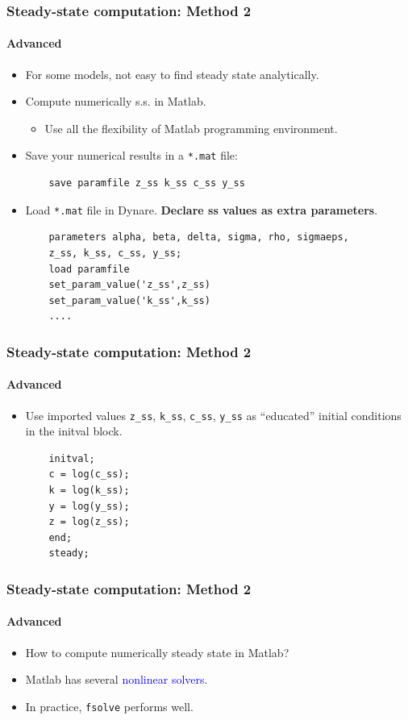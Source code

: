 \documentclass{beamer}
\begin{document}
\begin{frame}[fragile]
\frametitle{Steady-state computation: Method 2}
\framesubtitle{Advanced}
\small 
\begin{itemize}
	\item For some models, not easy to find steady state analytically.
	\item Compute numerically s.s. in Matlab.
	\begin{itemize}
		\item Use all the flexibility of Matlab programming environment.
	\end{itemize}
    \item Save your numerical results in a \texttt{*.mat} file:
	\begin{verbatim}
	save paramfile z_ss k_ss c_ss y_ss
	\end{verbatim}
	\item Load \texttt{*.mat} file in Dynare. \textbf{Declare ss values as extra parameters}.
	\begin{verbatim}
	parameters alpha, beta, delta, sigma, rho, sigmaeps, 
	z_ss, k_ss, c_ss, y_ss;  
	load paramfile
	set_param_value('z_ss',z_ss)
	set_param_value('k_ss',k_ss)
	....
	\end{verbatim}
\end{itemize}
\end{frame}

\begin{frame}[fragile]
\frametitle{Steady-state computation: Method 2}
\framesubtitle{Advanced}
\small 
\begin{itemize}
	\item Use imported values \texttt{z\_ss}, \texttt{k\_ss}, \texttt{c\_ss}, \texttt{y\_ss} as ``educated'' initial conditions in the initval block.
	\begin{verbatim}
	initval;
	c = log(c_ss);
	k = log(k_ss);
	y = log(y_ss);
	z = log(z_ss);
	end;
	steady;
	\end{verbatim}
\end{itemize}
\end{frame}

\begin{frame}[fragile]
\frametitle{Steady-state computation: Method 2}
\framesubtitle{Advanced}
\small 
\begin{itemize}
	\item How to compute numerically steady state in Matlab?
	\item Matlab has several \textcolor{blue}{nonlinear solvers}.
	\item In practice, \texttt{fsolve} performs well. 
\end{itemize}
\end{frame}
\end{document}
